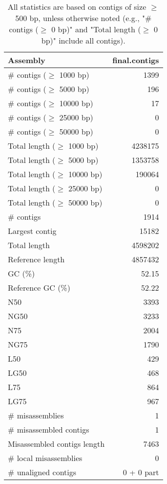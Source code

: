 \documentclass[12pt,a4paper]{article}
\begin{document}
\begin{table}[ht]
\begin{center}
\caption{All statistics are based on contigs of size $\geq$ 500 bp, unless otherwise noted (e.g., "\# contigs ($\geq$ 0 bp)" and "Total length ($\geq$ 0 bp)" include all contigs).}
\begin{tabular}{|l*{1}{|r}|}
\hline
Assembly & final.contigs \\ \hline
\# contigs ($\geq$ 1000 bp) & 1399 \\ \hline
\# contigs ($\geq$ 5000 bp) & 196 \\ \hline
\# contigs ($\geq$ 10000 bp) & 17 \\ \hline
\# contigs ($\geq$ 25000 bp) & 0 \\ \hline
\# contigs ($\geq$ 50000 bp) & 0 \\ \hline
Total length ($\geq$ 1000 bp) & 4238175 \\ \hline
Total length ($\geq$ 5000 bp) & 1353758 \\ \hline
Total length ($\geq$ 10000 bp) & 190064 \\ \hline
Total length ($\geq$ 25000 bp) & 0 \\ \hline
Total length ($\geq$ 50000 bp) & 0 \\ \hline
\# contigs & 1914 \\ \hline
Largest contig & 15182 \\ \hline
Total length & 4598202 \\ \hline
Reference length & 4857432 \\ \hline
GC (\%) & 52.15 \\ \hline
Reference GC (\%) & 52.22 \\ \hline
N50 & 3393 \\ \hline
NG50 & 3233 \\ \hline
N75 & 2004 \\ \hline
NG75 & 1790 \\ \hline
L50 & 429 \\ \hline
LG50 & 468 \\ \hline
L75 & 864 \\ \hline
LG75 & 967 \\ \hline
\# misassemblies & 1 \\ \hline
\# misassembled contigs & 1 \\ \hline
Misassembled contigs length & 7463 \\ \hline
\# local misassemblies & 0 \\ \hline
\# unaligned contigs & 0 + 0 part \\ \hline

\end{tabular}
\end{center}
\end{table}
\end{document}
